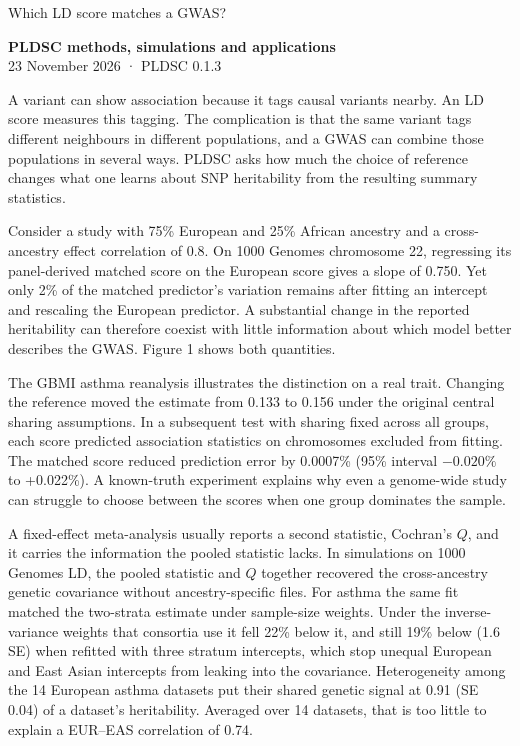 \documentclass[11pt,a4paper]{article}
\makeatletter
\renewcommand{\section}{\@startsection{section}{1}{\z@}{0pt}{0.4em}
  {\normalfont\huge\bfseries\color{ink}}}
\makeatother
\begin{document}
\section{Which LD score matches a GWAS?}\label{which-ld-score-matches-a-gwas}

\textbf{PLDSC methods, simulations and applications}\\
23 November 2026 · PLDSC 0.1.3

A variant can show association because it tags causal variants nearby. An LD score measures this tagging. The complication is that the same variant tags different neighbours in different populations, and a GWAS can combine those populations in several ways. PLDSC asks how much the choice of reference changes what one learns about SNP heritability from the resulting summary statistics.

Consider a study with 75\% European and 25\% African ancestry and a cross-ancestry effect correlation of 0.8. On 1000 Genomes chromosome 22, regressing its panel-derived matched score on the European score gives a slope of 0.750. Yet only 2\% of the matched predictor's variation remains after fitting an intercept and rescaling the European predictor. A substantial change in the reported heritability can therefore coexist with little information about which model better describes the GWAS. Figure 1 shows both quantities.

The GBMI asthma reanalysis illustrates the distinction on a real trait. Changing the reference moved the estimate from 0.133 to 0.156 under the original central sharing assumptions. In a subsequent test with sharing fixed across all groups, each score predicted association statistics on chromosomes excluded from fitting. The matched score reduced prediction error by 0.0007\% (95\% interval \(-0.020\%\) to +0.022\%). A known-truth experiment explains why even a genome-wide study can struggle to choose between the scores when one group dominates the sample.

A fixed-effect meta-analysis usually reports a second statistic, Cochran's \(Q\), and it carries the information the pooled statistic lacks. In simulations on 1000 Genomes LD, the pooled statistic and \(Q\) together recovered the cross-ancestry genetic covariance without ancestry-specific files. For asthma the same fit matched the two-strata estimate under sample-size weights. Under the inverse-variance weights that consortia use it fell 22\% below it, and still 19\% below (1.6 SE) when refitted with three stratum intercepts, which stop unequal European and East Asian intercepts from leaking into the covariance. Heterogeneity among the 14 European asthma datasets put their shared genetic signal at 0.91 (SE 0.04) of a dataset's heritability. Averaged over 14 datasets, that is too little to explain a EUR--EAS correlation of 0.74.
\end{document}
